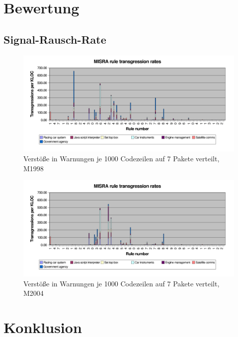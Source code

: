 \documentclass[a4paper,UKenglish,cleveref, autoref]{templates/lipics-v2019}
\begin{document}
    \section{Bewertung}
    \label{sec:bewertung}

    \subsection{Signal-Rausch-Rate}
    \label{subsec:signal-rausch-rate}

    \begin{figure}[H]
        \centering
        \captionsetup{justification=centering,margin=2cm}
        \includegraphics[width=\textwidth]{graphics/1998-transgression-rates.png}
        \caption{Verstöße in Warnungen je 1000 Codezeilen auf 7 Pakete verteilt, M1998}
    \end{figure}

    \begin{figure}[H]
        \centering
        \captionsetup{justification=centering,margin=2cm}
        \includegraphics[width=\textwidth]{graphics/2004-transgression-rates.png}
        \caption{Verstöße in Warnungen je 1000 Codezeilen auf 7 Pakete verteilt, M2004}
    \end{figure}

    \section{Konklusion}
    \label{sec:konklusion}



    
\end{document}

